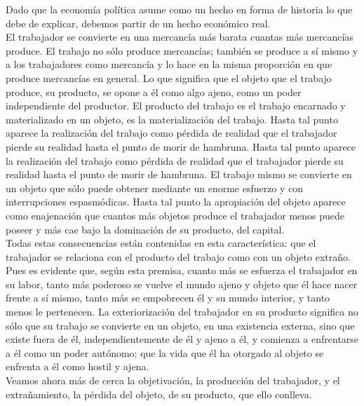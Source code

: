 Dado que la economía política asume como un hecho en forma de historia lo que debe de explicar, debemos partir de un hecho económico real. \\

El trabajador se convierte en una mercancía más barata cuantas más mercancías produce. El trabajo no sólo produce mercancías; también se produce a sí mismo y a los trabajadores como mercancía y lo hace en la misma proporción en que produce mercancías en general. Lo que significa que el objeto que el trabajo produce, su producto, se opone a él como algo ajeno, como un poder independiente del productor. El producto del trabajo es el trabajo encarnado y materializado en un objeto, es la materialización del trabajo. Hasta tal punto aparece la realización del trabajo como pérdida de realidad que el trabajador pierde su realidad hasta el punto de morir de hambruna. Hasta tal punto aparece la realización del trabajo como pérdida de realidad que el trabajador pierde su realidad hasta el punto de morir de hambruna. El trabajo mismo se convierte en un objeto que sólo puede obtener mediante un enorme esfuerzo y con interrupciones espasmódicas. Hasta tal punto la apropiación del objeto aparece como enajenación que cuantos más objetos produce el trabajador menos puede poseer y más cae bajo la dominación de su producto, del capital. \\

Todas estas consecuencias están contenidas en esta característica: que el trabajador se relaciona con el producto del trabajo como con un objeto extraño. Pues es evidente que, según esta premisa, cuanto más se esfuerza el trabajador en su labor, tanto más poderoso se vuelve el mundo ajeno y objeto que él hace nacer frente a sí mismo, tanto más se empobrecen él y su mundo interior, y tanto menos le pertenecen. La exteriorización del trabajador en su producto significa no sólo que su trabajo se convierte en un objeto, en una existencia externa, sino que existe fuera de él, independientemente de él y ajeno a él, y comienza a enfrentarse a él como un poder autónomo; que la vida que él ha otorgado al objeto se enfrenta a él como hostil y ajena.\\

Veamos ahora más de cerca la objetivación, la producción del trabajador, y el extrañamiento, la pérdida del objeto, de su producto, que ello conlleva.\\

